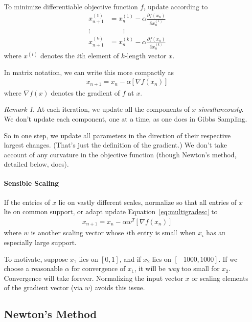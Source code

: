 \documentclass[a4paper,12pt]{scrartcl}
\theoremstyle{definition}
\theoremstyle{remark}
\newtheorem*{rmk}{Remark}
\begin{document}
To minimize differentiable objective function $f$, update according to
\begin{align*}
   x_{n+1}^{(1)} &= x_n^{(1)}
    - \alpha \frac{\partial f(x_n)}{\partial x_n^{(1)}}\\
   \vdots \quad & \qquad \vdots \\
   x_{n+1}^{(k)} &= x_n^{(k)}
    - \alpha \frac{\partial f(x_n)}{\partial x_n^{(k)}}
\end{align*}
where $x^{(i)}$ denotes the $i$th element of $k$-length vector $x$.

In matrix notation, we can write this more compactly as
\begin{align*}
  \label{eq:multigradesc}
  x_{n+1} = x_n - \alpha [\nabla f(x_n)]
\end{align*}
where $\nabla f(x)$ denotes the gradient of $f$ at $x$.

\begin{rmk}
At each iteration, we update all the components of $x$
\emph{simultaneously}.  We don't update each component, one at a time,
as one does in Gibbs Sampling.

So in one step, we update all parameters in the direction of their
respective largest changes. (That's just the definition of the
gradient.) We don't take account of any curvature in the objective
function (though Newton's method, detailed below, does).
\end{rmk}

\paragraph{Sensible Scaling}
If the entries of $x$ lie on vastly different scales, normalize so that
all entries of $x$ lie on common support, or adapt update
Equation~\ref{eq:multigradesc} to
\begin{align}
  x_{n+1} = x_n - \alpha w^T [\nabla f(x_n)]
\end{align}
where $w$ is another scaling vector whose $i$th entry is small when
$x_i$ has an especially large support.

To motivate, suppose $x_1$ lies on $[0,1]$, and if $x_2$ lies on
$[-1000, 1000]$. If we choose a reasonable $\alpha$ for convergence of
$x_1$, it will be \emph{way} too small for $x_2$. Convergence will take
forever. Normalizing the input vector $x$ or scaling elements of the
gradient vector (via $w$) avoids this issue.


\subsection{Newton's Method}
\end{document}
